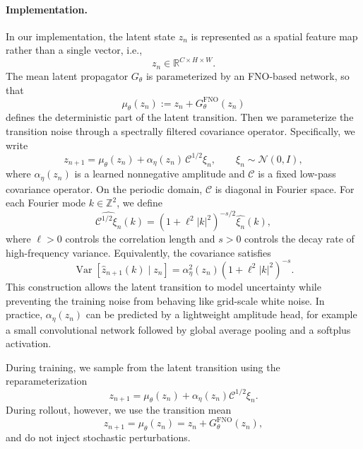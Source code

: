\documentclass[11pt]{article}
\begin{document}
\paragraph{Implementation.}
In our implementation, the latent state $z_n$ is represented as a spatial feature map rather than a single vector, i.e.,
\begin{equation}
    z_n \in \mathbb R^{C\times H\times W}.
\end{equation}
The mean latent propagator $G_\theta$ is parameterized by an FNO-based network, so that
\begin{equation}
    \mu_\theta(z_n)
    :=
    z_n + G_\theta^{\mathrm{FNO}}(z_n)
\end{equation}
defines the deterministic part of the latent transition. Then we parameterize the transition noise through a spectrally filtered covariance operator. Specifically, we write
\begin{equation}
    z_{n+1}
    =
    \mu_\theta(z_n)
    +
    \alpha_\eta(z_n)\,\mathcal C^{1/2}\xi_n,
    \qquad
    \xi_n\sim\mathcal N(0,I),
\end{equation}
where $\alpha_\eta(z_n)$ is a learned nonnegative amplitude and $\mathcal C$ is a fixed low-pass covariance operator. On the periodic domain, $\mathcal C$ is diagonal in Fourier space. For each Fourier mode $k\in\mathbb Z^2$, we define
\begin{equation}
    \widehat{\mathcal C^{1/2}\xi_n}(k)
    =
    \left(1+\ell^2|k|^2\right)^{-s/2}
    \widehat{\xi_n}(k),
\end{equation}
where $\ell>0$ controls the correlation length and $s>0$ controls the decay rate of high-frequency variance. Equivalently, the covariance satisfies
\begin{equation}
    \operatorname{Var}\!\left[
        \widehat{z}_{n+1}(k)
        \mid z_n
    \right]
    =
    \alpha_\eta^2(z_n)
    \left(1+\ell^2|k|^2\right)^{-s}.
\end{equation}
This construction allows the latent transition to model uncertainty while preventing the training noise from behaving like grid-scale white noise. In practice, $\alpha_\eta(z_n)$ can be predicted by a lightweight amplitude head, for example a small convolutional network followed by global average pooling and a softplus activation.

During training, we sample from the latent transition using the reparameterization
\begin{equation}
    z_{n+1}
    =
    \mu_\theta(z_n)
    +
    \alpha_\eta(z_n)\mathcal C^{1/2}\xi_n.
\end{equation}
During rollout, however, we use the transition mean
\begin{equation}
    z_{n+1}
    =
    \mu_\theta(z_n)
    =
    z_n + G_\theta^{\mathrm{FNO}}(z_n),
\end{equation}
and do not inject stochastic perturbations. 
\end{document}
